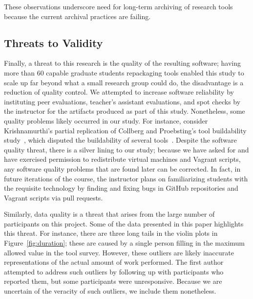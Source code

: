 \documentclass[10pt,conference]{IEEEtran}
\begin{document}
These observations underscore need for long-term archiving of research
tools because the current archival practices are failing.
 
\subsection{Threats to Validity}


Finally, a threat to this research is the quality
of the resulting software; 	
having more than 60 capable 
graduate students repackaging tools enabled this study 
to scale up far beyond what a small research group could 
do, the disadvantage is a reduction of quality control.
We attempted to increase software reliability by
instituting peer evaluations, teacher's assistant evaluations,
and spot checks by the instructor for the artifacts produced
as part of this study.
Nonetheless, some quality problems likely occurred in our study.
For instance, consider Krishnamurthi's partial replication of 
Collberg and Proebsting's tool buildability study~\cite{collberg2016repeatability},
which disputed the buildability of several tools~\cite{skRep}.
Despite the software quality threat, there is a silver lining
to our study; because we have asked for and have exercised 
permission to redistribute virtual machines and Vagrant scripts,
any software quality problems that are found later can be 
corrected.
In fact, in future iterations of the course, the instructor 
plans on familiarizing students with the requisite technology
by finding and fixing bugs in GitHub repositories and 
Vagrant scripts via pull requests.

Similarly, data quality is a threat that arises from the large
number of participants on this project.
Some of the data presented in this paper highlights this threat.
For instance, there are three long tails in the violin plots in 
Figure~\ref{fig:duration}; these are caused by a single person 
filling in the maximum allowed value in the tool survey.
However, these outliers are likely inaccurate representations
of the actual amount of work performed.
The first author attempted to address such outliers by following
up with participants who reported them, but some participants 
were unresponsive.
Because we are uncertain of the veracity of such outliers,
we include them nonetheless.
\end{document}
